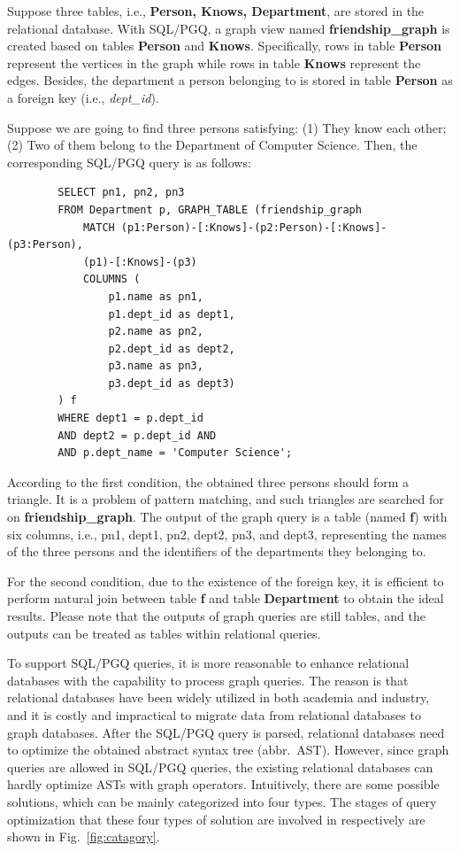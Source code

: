 \begin{example}
    \label{example:introduction:sqlpgq}
    Suppose three tables, i.e., \textbf{Person, Knows, Department}, are stored in the relational database.
    With SQL/PGQ, a graph view named \textbf{friendship\_graph} is created based on tables \textbf{Person} and \textbf{Knows}.
    Specifically, rows in table \textbf{Person} represent the vertices in the graph while rows in table \textbf{Knows} represent the edges.
    Besides, the department a person belonging to is stored in table \textbf{Person} as a foreign key (i.e., \textit{dept\_id}).

    Suppose we are going to find three persons satisfying: (1) They know each other; (2) Two of them belong to the Department of Computer Science.
    Then, the corresponding SQL/PGQ query is as follows:
    \begin{lstlisting}
        SELECT pn1, pn2, pn3
        FROM Department p, GRAPH_TABLE (friendship_graph
            MATCH (p1:Person)-[:Knows]-(p2:Person)-[:Knows]-(p3:Person),
            (p1)-[:Knows]-(p3)
            COLUMNS (
                p1.name as pn1,
                p1.dept_id as dept1,
                p2.name as pn2,
                p2.dept_id as dept2,
                p3.name as pn3,
                p3.dept_id as dept3)
        ) f
        WHERE dept1 = p.dept_id
        AND dept2 = p.dept_id AND
        AND p.dept_name = 'Computer Science';
    \end{lstlisting}
    According to the first condition, the obtained three persons should form a triangle.
    It is a problem of pattern matching, and such triangles are searched for on \textbf{friendship\_graph}.
    The output of the graph query is a table (named \textbf{f}) with six columns, i.e., pn1, dept1, pn2, dept2, pn3, and dept3, representing the names of the three persons and the identifiers of the departments they belonging to.

    For the second condition, due to the existence of the foreign key, it is efficient to perform natural join between table \textbf{f} and table \textbf{Department} to obtain the ideal results.
    Please note that the outputs of graph queries are still tables, and the outputs can be treated as tables within relational queries.
\end{example}

To support SQL/PGQ queries, it is more reasonable to enhance relational databases with the capability to process graph queries.
The reason is that relational databases have been widely utilized in both academia and industry, and it is costly and impractical to migrate data from relational databases to graph databases.
After the SQL/PGQ query is parsed, relational databases need to optimize the obtained abstract syntax tree (abbr.~AST).
However, since graph queries are allowed in SQL/PGQ queries, the existing relational databases can hardly optimize ASTs with graph operators.
Intuitively, there are some possible solutions, which can be mainly categorized into four types.
The stages of query optimization that these four types of solution are involved in respectively are shown in Fig.~\ref{fig:catagory}.

